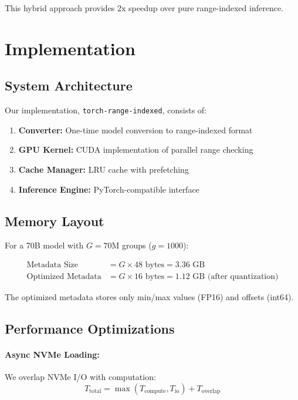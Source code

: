 \documentclass[twocolumn,10pt]{article}
\begin{document}
This hybrid approach provides 2x speedup over pure range-indexed inference.

\section{Implementation}

\subsection{System Architecture}

Our implementation, \texttt{torch-range-indexed}, consists of:

\begin{enumerate}
    \item \textbf{Converter:} One-time model conversion to range-indexed format
    \item \textbf{GPU Kernel:} CUDA implementation of parallel range checking
    \item \textbf{Cache Manager:} LRU cache with prefetching
    \item \textbf{Inference Engine:} PyTorch-compatible interface
\end{enumerate}

\subsection{Memory Layout}

For a 70B model with $G=70\text{M}$ groups ($g=1000$):

\begin{align}
\text{Metadata Size} &= G \times 48 \text{ bytes} = 3.36 \text{ GB} \\
\text{Optimized Metadata} &= G \times 16 \text{ bytes} = 1.12 \text{ GB (after quantization)}
\end{align}

The optimized metadata stores only min/max values (FP16) and offsets (int64).

\subsection{Performance Optimizations}

\paragraph{Async NVMe Loading:} We overlap NVMe I/O with computation:
\begin{equation}
T_{\text{total}} = \max(T_{\text{compute}}, T_{\text{io}}) + T_{\text{overlap}}
\end{equation}
\end{document}
